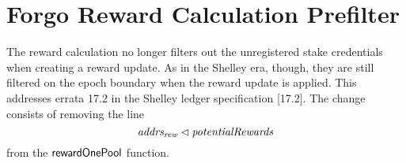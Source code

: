 \newcommand{\Stake}{\type{Stake}}
\newcommand{\mReward}[4]{\fun{r_{member}}~ \var{#1}~ \var{#2}~ \var{#3}~ {#4}}
\newcommand{\lReward}[4]{\fun{r_{operator}}~ \var{#1}~ \var{#2}~ \var{#3}~ {#4}}

\section{Forgo Reward Calculation Prefilter}

The reward calculation no longer filters out the unregistered stake
credentials when creating a reward update. As in the Shelley era, though,
they are still filtered on the epoch boundary when the reward update is applied.
This addresses errata 17.2 in the Shelley ledger specification \cite{shelley_spec}[17.2].
The change consists of removing the line
$$\mathit{addrs_{rew}}\lhd{\ensuremath{\mathit{potentialRewards}}}$$
from the $\mathsf{rewardOnePool}$ function.

